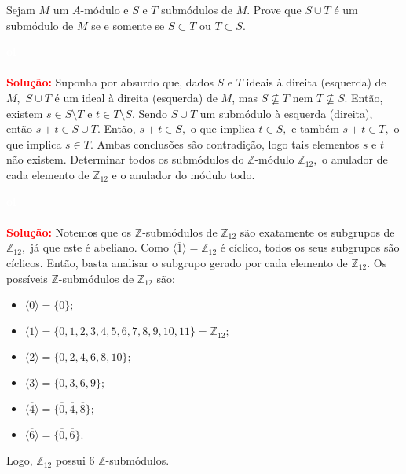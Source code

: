 \documentclass[11pt,a4paper]{article}
\newcounter{exercicio}[section]
\newcommand{\solucao}[1]{
\textbf{\textcolor{white}{oi}\\ \\ \textcolor{red}{Solução:}} #1}
\begin{document}
  Sejam $M$ um $A$-módulo e $S$ e $T$ submódulos de $M.$ Prove que $S \cup T$ é um submódulo de $M$ se e somente se $S \subset T$ ou $T \subset S.$ 
\solucao{Suponha por absurdo que, dados $S$ e $T$ ideais à direita (esquerda) de $M,$ $S \cup T$ é um ideal à direita (esquerda) de $M$, mas $S \nsubseteq T$ nem $T \nsubseteq S.$ Então, existem $s \in S \setminus T$ e $t \in T \setminus S.$ Sendo $S \cup T$ um submódulo à esquerda (direita), então $s+t \in S \cup T.$ Então, $s+t \in S,$ o que implica $t \in S,$ e também $s+t \in T,$ o que implica $s \in T.$ Ambas conclusões são contradição, logo tais elementos $s$ e $t$ não existem.}
 Determinar todos os submódulos do $\mathbb{Z}$-módulo $\mathbb{Z}_{12},$ o anulador de cada elemento de $\mathbb{Z}_{12}$ e o anulador do módulo todo.
\solucao{
Notemos que os $\mathbb{Z}$-submódulos de $\mathbb{Z}_{12}$ são exatamente os subgrupos de $\mathbb{Z}_{12},$ já que este é abeliano. Como $\langle \overline{1} \rangle = \mathbb{Z}_{12}$ é cíclico, todos os seus subgrupos são cíclicos. Então, basta analisar o subgrupo gerado por cada elemento de $\mathbb{Z}_{12}.$ Os possíveis $\mathbb{Z}$-submódulos de $\mathbb{Z}_{12}$ são:
\begin{itemize}
    \item $ \langle \overline{0} \rangle = \{ \overline{0} \};$
    \item $ \langle \overline{1} \rangle = \{ \overline{0}, \overline{1}, \overline{2},\overline{3}, \overline{4}, \overline{5}, \overline{6}, \overline{7}, \overline{8}, \overline{9}, \overline{10}, \overline{11}\} = \mathbb{Z}_{12};$
    \item $ \langle \overline{2} \rangle = \{ \overline{0},  \overline{2}, \overline{4},  \overline{6}, \overline{8},  \overline{10}\};$
    \item $ \langle \overline{3} \rangle = \{ \overline{0}, \overline{3}, \overline{6}, \overline{9}\};$
    \item $ \langle \overline{4} \rangle = \{ \overline{0}, \overline{4}, \overline{8}\} ;$
    \item $ \langle \overline{6} \rangle = \{ \overline{0},  \overline{6}\}.$
\end{itemize}

\noindent
Logo, $\mathbb{Z}_{12}$ possui $6$ $\mathbb{Z}$-submódulos.

}
\end{document}
